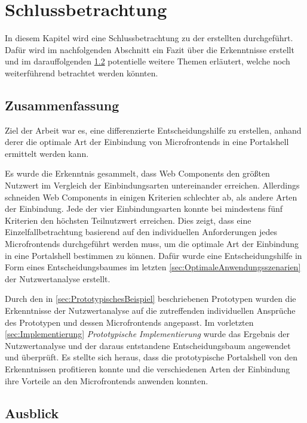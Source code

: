 \section{Schlussbetrachtung}\label{sec:Schlussbetrachtung}

In diesem Kapitel wird eine Schlussbetrachtung zu der erstellten \dokumententyp{} durchgeführt. Dafür wird im nachfolgenden Abschnitt ein Fazit über die Erkenntnisse erstellt und im darauffolgenden \cref{sec:Ausblick} potentielle weitere Themen erläutert, welche noch weiterführend betrachtet werden könnten.

\subsection{Zusammenfassung}\label{sec:Fazit}

Ziel der Arbeit war es, eine differenzierte Entscheidungshilfe zu erstellen, anhand derer die optimale Art der Einbindung von Microfrontends in eine Portalshell ermittelt werden kann.

Es wurde die Erkenntnis gesammelt, dass Web Components den größten Nutzwert im Vergleich der Einbindungsarten untereinander erreichen. Allerdings schneiden Web Components in einigen Kriterien schlechter ab, als andere Arten der Einbindung. Jede der vier Einbindungsarten konnte bei mindestens fünf Kriterien den höchsten Teilnutzwert erreichen. Dies zeigt, dass eine Einzelfallbetrachtung basierend auf den individuellen Anforderungen jedes Microfrontends durchgeführt werden muss, um die optimale Art der Einbindung in eine Portalshell bestimmen zu können. Dafür wurde eine Entscheidungshilfe in Form eines Entscheidungsbaumes im letzten \cref{sec:OptimaleAnwendungsszenarien} der Nutzwertanalyse erstellt. 

Durch den in \cref{sec:PrototypischesBeispiel} beschriebenen Prototypen wurden die Erkenntnisse der Nutzwertanalyse auf die zutreffenden individuellen Ansprüche des Prototypen und dessen Microfrontends angepasst. Im vorletzten \cref{sec:Implementierung} \textit{Prototypische Implementierung} wurde das Ergebnis der Nutzwertanalyse und der daraus entstandene Entscheidungsbaum angewendet und überprüft. Es stellte sich heraus, dass die prototypische Portalshell von den Erkenntnissen profitieren konnte und die verschiedenen Arten der Einbindung ihre Vorteile an den Microfrontends anwenden konnten.

\subsection{Ausblick}\label{sec:Ausblick}

